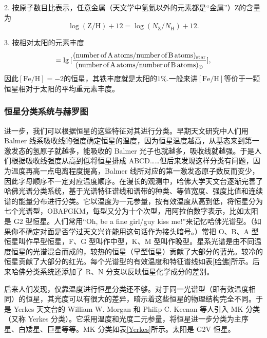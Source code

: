 \documentclass[../天体物理基础.tex]{subfiles}
\begin{document}
2. 按原子数目比表示，任意金属（天文学中氢氦以外的元素都是“金属”）$\mathrm{Z}$的含量为
\begin{equation}
\log(\mathrm{Z}/\mathrm{H})+12=\log(N_{\mathrm{Z}}/N_{\mathrm{H}})+12.
\end{equation}

3. 按相对太阳的元素丰度
\begin{equation}
[A/B]=\lg\,[\frac{(\textrm{number\,of\,A\,atoms/number\,of\,B\,atoms})_{\mathrm{star}}}{(\textrm{number\,of\,A\,atoms/number\,of\,B\,atoms})_{\mathrm{\odot}}}],
\end{equation}
因此$[\mathrm{Fe/H}]=-2$的恒星，其铁丰度就是太阳的$1\%$.一般来讲$[\mathrm{Fe/H}]$等价于一颗恒星相对于太阳的平均重元素丰度。

\subsubsection{恒星分类系统与赫罗图}
进一步，我们可以根据恒星的这些特征对其进行分类。早期天文研究中人们用 Balmer 线系吸收线的强度确定恒星的温度，因为恒星温度越高，从基态来到第一激发态的氢原子就越多，能吸收的 Balmer 光子也就越多，吸收线就越强。于是人们根据吸收线强度从高到低将恒星排成 ABCD……但后来发现这样分类有问题，因为温度再高一点电离程度提高，Balmer 线所对应的第一激发态原子数反而变少，因此字母顺序不一定对应温度顺序。在漫长的观测中，哈佛大学天文台逐渐完善了哈佛光谱分类系统，基于光谱特征谱线和谱带的种类、等值宽度、强度比值和连续谱的能量分布进行分类。它以温度为一元参量，按有效温度从高到低，将恒星分为七个光谱型，OBAFGKM，每型又分为十个次型，用阿拉伯数字表示，比如太阳是 G2 型恒星。人们常用``Oh, be a fine girl/guy kiss me!''来记忆哈佛光谱型。（如果你不确定对面是否学过天文兴许能用这句话作为接头暗号。）常把 O、B、A 型恒星叫作早型恒星，F、G 型叫作中型，K、M 型叫作晚型。星系光谱是由不同温度恒星的光谱混合而成的，较热的恒星（早型恒星）贡献了大部分的蓝光。较冷的恒星贡献了大部分的红光。每个光谱型的有效温度和特征谱线如表\ref{哈佛}所示。后来哈佛分类系统还添加了 R、N 分支以反映恒星化学成分的差别。

后来人们发现，仅靠温度进行恒星分类还不够。对于同一光谱型（即有效温度相同）的恒星，其光度可以有很大的差异，暗示着这些恒星的物理结构完全不同。于是 Yerkes 天文台的 William W. Morgan 和 Philip C. Keenan 等人引入 MK 分类（又称 Yerkes 分类）。它采用温度和光度二元参量，将恒星进一步分类为主序星、白矮星、巨星等等。MK 分类如表\ref{Yerkes}所示。太阳是 G2V 恒星。
\end{document}
